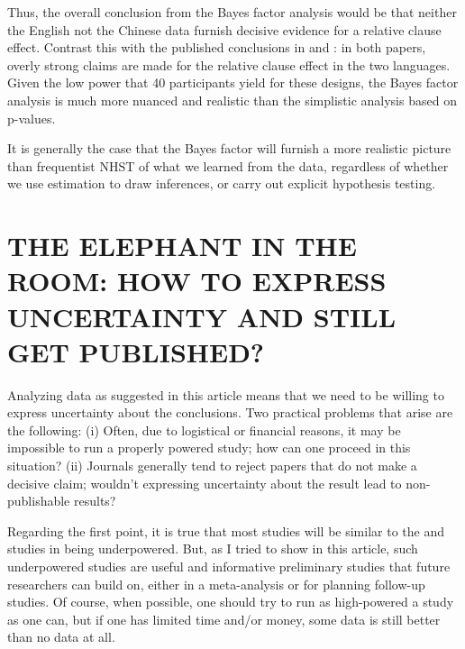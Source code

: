 \documentclass{ar-1col}\usepackage[]{graphicx}\usepackage[]{color}
\begin{document}
Thus, the overall conclusion from the Bayes factor analysis would be that neither the English not the Chinese data furnish decisive evidence for a relative clause effect. Contrast this with the published conclusions in \citet{grodner} and \citet{gibsonwu}: in both papers, overly strong claims are made for the relative clause effect in the two languages. Given the low power that 40 participants yield for these designs, the Bayes factor analysis is much more nuanced and realistic than the simplistic analysis based on p-values.

It is generally the case that the Bayes factor will furnish a more realistic picture than frequentist NHST of what we learned from the data, regardless of whether we use estimation to draw inferences, or carry out explicit hypothesis testing.  

\section{THE ELEPHANT IN THE ROOM: HOW TO EXPRESS UNCERTAINTY AND STILL GET PUBLISHED?}

Analyzing data as suggested in this article means that we need to be willing to express uncertainty about the conclusions. Two practical problems that arise are the following: (i) Often, due to logistical or financial reasons, it may be impossible to run a properly powered study; how can one proceed in this situation? (ii) Journals generally tend to reject papers that do not make a decisive claim; wouldn't expressing uncertainty about the result lead to non-publishable results?

Regarding the first point, it is true that most studies will be similar to the \citet{grodner} and \citet{gibsonwu} studies in  being underpowered. But, as I tried to show in this article, such underpowered studies are useful and informative preliminary studies that future researchers can build on, either in a meta-analysis or for planning follow-up studies.  Of course, when possible, one should try to run as high-powered a study as one can, but if one has limited time and/or money, some data is still better than no data at all.
\end{document}
